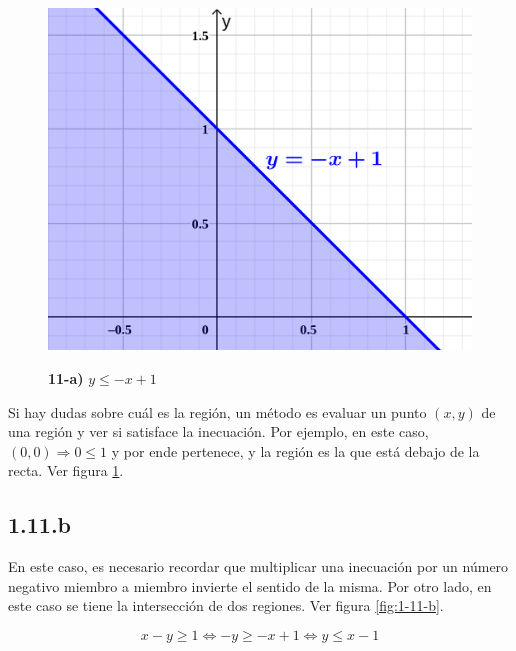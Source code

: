 \documentclass{article}
\begin{document}
\begin{figure}[ht]
\caption{\textbf{11-a)} $y \leq -x + 1$}
\includegraphics[scale=2.75]{../img/exercises/guide_01/11_a.png} 
\centering
\label{fig:1-11-a}
\end{figure}

Si hay dudas sobre cuál es la región, un método es evaluar un punto $(x,y)$ de una región y ver si satisface la inecuación. Por ejemplo, en este caso, $(0,0) \Rightarrow 0 \leq 1$ y por ende pertenece, y la región es la que está debajo de la recta. Ver figura \ref{fig:1-11-a}.

\subsection*{1.11.b}
\label{subsec:1.11.b}

En este caso, es necesario recordar que multiplicar una inecuación por un número negativo miembro a miembro invierte el sentido de la misma. Por otro lado, en este caso se tiene la intersección de dos regiones. Ver figura \ref{fig:1-11-b}.

\begin{equation}
x - y \geq 1 \Leftrightarrow -y \geq -x + 1 \Leftrightarrow y \leq x - 1
\end{equation}
\end{document}
